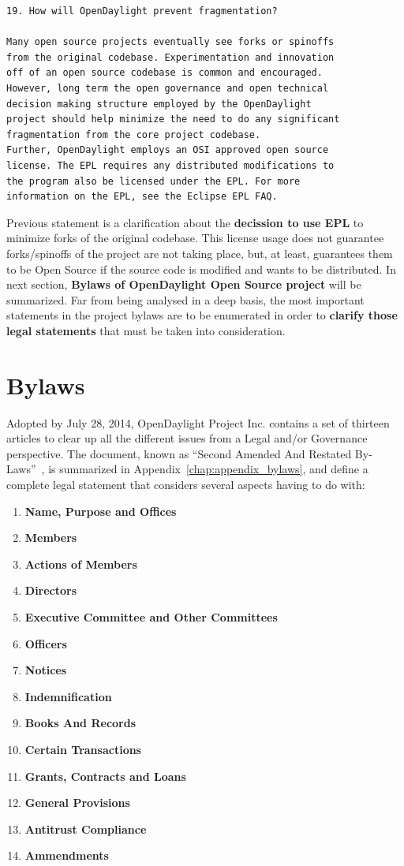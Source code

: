 \documentclass[a4paper, 12pt]{book}
\begin{document}
\begin{verbatim}
19. How will OpenDaylight prevent fragmentation?

Many open source projects eventually see forks or spinoffs
from the original codebase. Experimentation and innovation
off of an open source codebase is common and encouraged.
However, long term the open governance and open technical
decision making structure employed by the OpenDaylight
project should help minimize the need to do any significant
fragmentation from the core project codebase.
Further, OpenDaylight employs an OSI approved open source
license. The EPL requires any distributed modifications to
the program also be licensed under the EPL. For more
information on the EPL, see the Eclipse EPL FAQ.
\end{verbatim}
\noindent Previous statement is a clarification about the \textbf{decission to use EPL} to minimize forks of the original codebase. This license usage does not guarantee forks/spinoffs of the project are not taking place, but, at least, guarantees them to be Open Source if the source code is modified and wants to be distributed. In next section, \textbf{Bylaws of OpenDaylight Open Source project} will be summarized. Far from being analysed in a deep basis, the most important statements in the project bylaws are to be enumerated in order to \textbf{clarify those legal statements} that must be taken into consideration.

\section{Bylaws}
\label{sec:bylaws}
Adopted by July 28, 2014, OpenDaylight Project Inc. contains a set of thirteen articles to clear up all the different issues from a Legal and/or Governance perspective. The document, known as ``Second Amended And Restated By-Laws''~\cite{OpenDaylightBylaws}, is summarized in Appendix~\ref{chap:appendix_bylaws}, and define a complete legal statement that considers several aspects having to do with:
\begin{enumerate}\itemsep0pt
 \item{\textbf{Name, Purpose and Offices}}
 \item{\textbf{Members}}
 \item{\textbf{Actions of Members}}
 \item{\textbf{Directors}}
 \item{\textbf{Executive Committee and Other Committees}}
 \item{\textbf{Officers}}
 \item{\textbf{Notices}}
 \item{\textbf{Indemnification}}
 \item{\textbf{Books And Records}}
 \item{\textbf{Certain Transactions}}
 \item{\textbf{Grants, Contracts and Loans}}
 \item{\textbf{General Provisions}}
 \item{\textbf{Antitrust Compliance}}
 \item{\textbf{Ammendments}}
\end{enumerate}
\end{document}

